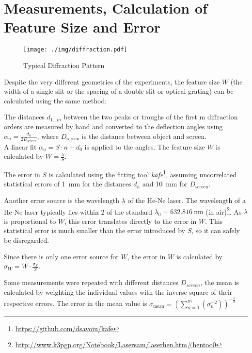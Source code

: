 \section{Measurements, Calculation of Feature Size and Error}\label{sec:meas}
\begin{figure}[tb]
	\centering
	\texttt{[image: ./img/diffraction.pdf]}
	\caption{Typical Diffraction Pattern}
	\label{fig:diffraction}
\end{figure}
Despite the very different geometries of the experiments, the feature size $W$ (the width of a single slit or the spacing of a double slit or optical grating) can be calculated using the same method:

The distances $d_{1 \dots m}$ between the two peaks or troughs of the first m diffraction orders are measured by hand and converted to the deflection angles using $\alpha_n = \frac{d_n}{2 D_\text{screen}}$, where $D_\text{screen}$ is the distance between object and screen.\\
A linear fit $\alpha_n = S \cdot n + d_0$ is applied to the angles.
The feature size $W$ is calculated by $W = \frac{\lambda}{S}$.

The error in $S$ is calculated using the fitting tool \textit{kafe}\footnote{\url{https://github.com/dsavoiu/kafe}}, assuming uncorrelated statistical errors of \SI{1}{\mm} for the distances $d_n$ and \SI{10}{\mm} for $D_\text{screen}$.


Another error source is the wavelength $\lambda$ of the He-Ne laser.
The wavelength of a He-Ne laser typically lies within \SI{2}{\ppm} of the standard $\lambda_0 = \SI{632.816}{\nm}$ (in air)\footnote{\url{http://www.k3pgp.org/Notebook/Lasersam/laserhen.htm\#hentoo0}}.
As $\lambda$ is proportional to $W$, this error translates directly to the error in $W$.
This statistical error is much smaller than the error introduced by $S$, so it can safely be disregarded.

Since there is only one error source for $W$, the error in $W$ is calculated by $\sigma_W = W \cdot \frac{\sigma_S}{S}$.

Some measurements were repeated with different distances $D_{screen}$, the mean is calculated by weighting the individual values with the inverse square of their respective errors.
The error in the mean value is $\sigma_\text{mean} = \left(\sum_{n = 1}^m (\sigma_n^{-2})\right)^{-\frac{1}{2}}$
